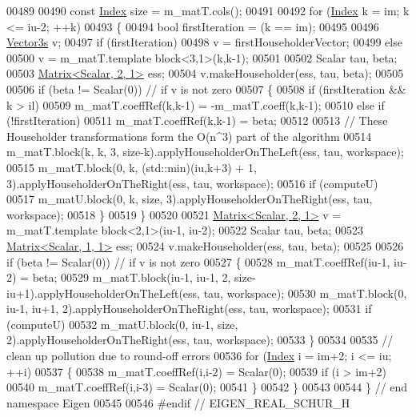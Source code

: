 \begin{DoxyCode}
00489 
00490   \textcolor{keyword}{const} \hyperlink{group___eigenvalues___module_a8bd4653e2d9569a44ecc95e746422d3f}{Index} size = m\_matT.cols();
00491 
00492   \textcolor{keywordflow}{for} (\hyperlink{group___eigenvalues___module_a8bd4653e2d9569a44ecc95e746422d3f}{Index} k = im; k <= iu-2; ++k)
00493   \{
00494     \textcolor{keywordtype}{bool} firstIteration = (k == im);
00495 
00496     \hyperlink{group___core___module}{Vector3s} v;
00497     \textcolor{keywordflow}{if} (firstIteration)
00498       v = firstHouseholderVector;
00499     \textcolor{keywordflow}{else}
00500       v = m\_matT.template block<3,1>(k,k-1);
00501 
00502     Scalar tau, beta;
00503     \hyperlink{group___core___module_class_eigen_1_1_matrix}{Matrix<Scalar, 2, 1>} ess;
00504     v.makeHouseholder(ess, tau, beta);
00505     
00506     \textcolor{keywordflow}{if} (beta != Scalar(0)) \textcolor{comment}{// if v is not zero}
00507     \{
00508       \textcolor{keywordflow}{if} (firstIteration && k > il)
00509         m\_matT.coeffRef(k,k-1) = -m\_matT.coeff(k,k-1);
00510       \textcolor{keywordflow}{else} \textcolor{keywordflow}{if} (!firstIteration)
00511         m\_matT.coeffRef(k,k-1) = beta;
00512 
00513       \textcolor{comment}{// These Householder transformations form the O(n^3) part of the algorithm}
00514       m\_matT.block(k, k, 3, size-k).applyHouseholderOnTheLeft(ess, tau, workspace);
00515       m\_matT.block(0, k, (std::min)(iu,k+3) + 1, 3).applyHouseholderOnTheRight(ess, tau, workspace);
00516       \textcolor{keywordflow}{if} (computeU)
00517         m\_matU.block(0, k, size, 3).applyHouseholderOnTheRight(ess, tau, workspace);
00518     \}
00519   \}
00520 
00521   \hyperlink{group___core___module_class_eigen_1_1_matrix}{Matrix<Scalar, 2, 1>} v = m\_matT.template block<2,1>(iu-1, iu-2);
00522   Scalar tau, beta;
00523   \hyperlink{group___core___module_class_eigen_1_1_matrix}{Matrix<Scalar, 1, 1>} ess;
00524   v.makeHouseholder(ess, tau, beta);
00525 
00526   \textcolor{keywordflow}{if} (beta != Scalar(0)) \textcolor{comment}{// if v is not zero}
00527   \{
00528     m\_matT.coeffRef(iu-1, iu-2) = beta;
00529     m\_matT.block(iu-1, iu-1, 2, size-iu+1).applyHouseholderOnTheLeft(ess, tau, workspace);
00530     m\_matT.block(0, iu-1, iu+1, 2).applyHouseholderOnTheRight(ess, tau, workspace);
00531     \textcolor{keywordflow}{if} (computeU)
00532       m\_matU.block(0, iu-1, size, 2).applyHouseholderOnTheRight(ess, tau, workspace);
00533   \}
00534 
00535   \textcolor{comment}{// clean up pollution due to round-off errors}
00536   \textcolor{keywordflow}{for} (\hyperlink{group___eigenvalues___module_a8bd4653e2d9569a44ecc95e746422d3f}{Index} i = im+2; i <= iu; ++i)
00537   \{
00538     m\_matT.coeffRef(i,i-2) = Scalar(0);
00539     \textcolor{keywordflow}{if} (i > im+2)
00540       m\_matT.coeffRef(i,i-3) = Scalar(0);
00541   \}
00542 \}
00543 
00544 \} \textcolor{comment}{// end namespace Eigen}
00545 
00546 \textcolor{preprocessor}{#endif // EIGEN\_REAL\_SCHUR\_H}
\end{DoxyCode}
